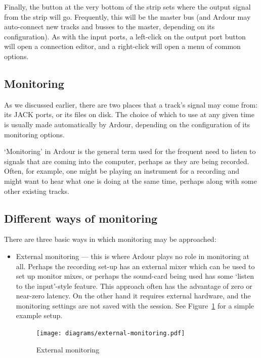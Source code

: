 \documentclass[10pt,a4paper]{book}
\begin{document}
{Finally, the button at the very bottom of the strip sets where the
output signal from the strip will go.  Frequently, this will be the
master bus (and Ardour may auto-connect new tracks and busses to the
master, depending on its configuration).  As with the input ports, a
left-click on the output port button will open a connection editor,
and a right-click will open a menu of common options.



\subsection{Monitoring}

As we discussed earlier, there are two places that a track's signal
may come from: its JACK ports, or its files on disk.  The choice of
which to use at any given time is usually made automatically by
Ardour, depending on the configuration of its monitoring options.

`Monitoring' in Ardour is the general term used for the frequent need
to listen to signals that are coming into the computer, perhaps as
they are being recorded.  Often, for example, one might be playing an
instrument for a recording and might want to hear what one is doing at
the same time, perhaps along with some other existing tracks.


\subsection{Different ways of monitoring}

There are three basic ways in which monitoring may be approached:

\begin{itemize}
\item External monitoring --- this is where Ardour plays no role in
  monitoring at all.  Perhaps the recording set-up has an external
  mixer which can be used to set up monitor mixes, or perhaps the
  sound-card being used has some `listen to the input'-style feature.
  This approach often has the advantage of zero or near-zero latency.
  On the other hand it requires external hardware, and the monitoring
  settings are not saved with the session.  See
  Figure~\ref{fig:external-monitoring} for a simple example setup.

\begin{figure}[ht]
\begin{center}
\texttt{[image: diagrams/external-monitoring.pdf]}
\end{center}
\caption{External monitoring}
\label{fig:external-monitoring}
\end{figure}


\end{itemize}}
\end{document}
